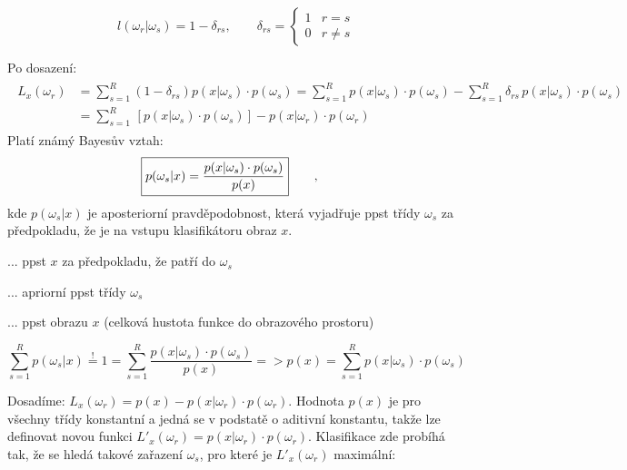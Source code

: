 \begin{equation}
l(\omega_r | \omega_s) = 1 - \delta_{rs}, \qquad \delta_{rs} = \begin{cases} 1 & r=s \\ 0 & r \neq s \end{cases}
\end{equation}

Po dosazení:
\begin{align}
\begin{split}
L_x(\omega_r) &= \displaystyle{\sum_{s=1}^R} (1-\delta_{rs}) p(x|\omega_s) \cdot p(\omega_s) = \displaystyle{\sum_{s=1}^R} p(x|\omega_s) \cdot p(\omega_s) - \displaystyle{\sum_{s=1}^R} \delta_{rs} \, p(x|\omega_s) \cdot p(\omega_s) \\ &= \displaystyle{\sum_{s=1}^R} \, \left[p(x|\omega_s) \cdot p(\omega_s)\right] - p(x|\omega_r) \cdot p(\omega_r)
\end{split}
\end{align}
Platí známý Bayesův vztah:
\begin{align}
\Aboxed{p(\omega_s|x) = \frac{p(x|\omega_s) \cdot p(\omega_s)}{p(x)}} \qquad ,
\end{align}
kde $ p(\omega_s|x) $ je aposteriorní pravděpodobnost, která vyjadřuje ppst třídy $ \omega_s $ za předpokladu, že je na vstupu klasifikátoru obraz $ x $.

\begin{description}[leftmargin=!, labelwidth=\widthof{$ p(x|\omega_s) $}]
\item[$ p(x|\omega_s) $] ... ppst $ x $ za předpokladu, že patří do $ \omega_s $
\item[$ p(\omega_s) $] ... apriorní ppst třídy $ \omega_s $
\item[$ p(x) $] ... ppst obrazu $ x $ (celková hustota funkce do obrazového prostoru) 
\end{description}

\begin{equation}
\displaystyle{\sum_{s=1}^R} p(\omega_s|x) \overset{!}{=} 1 = \displaystyle{\sum_{s=1}^R} \frac{p(x|\omega_s) \cdot p(\omega_s)}{p(x)} => p(x) = \displaystyle{\sum_{s=1}^R} p(x|\omega_s) \cdot p(\omega_s)
\end{equation}

Dosadíme: $ L_x(\omega_r) = p(x) - p(x|\omega_r) \cdot p(\omega_r) $. Hodnota $ p(x) $ je pro všechny třídy konstantní a jedná se v podstatě o aditivní konstantu, takže lze definovat novou funkci $ L'_x(\omega_r) = p(x|\omega_r) \cdot p(\omega_r) $. Klasifikace zde probíhá tak, že se hledá takové zařazení $ \omega_s $, pro které je $ L'_x(\omega_r) $ maximální:

